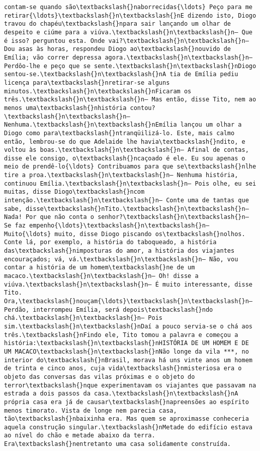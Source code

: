 \begin{Verbatim}[commandchars=\\\{\}]
contam-se quando são\textbackslash{}naborrecidas{\ldots} Peço para me retirar{\ldots}\textbackslash{}n\textbackslash{}nE dizendo isto, Diogo travou do chapéu\textbackslash{}npara sair lançando um olhar de despeito e ciúme para a viúva.\textbackslash{}n\textbackslash{}n— Que é isso? perguntou esta. Onde vai?\textbackslash{}n\textbackslash{}n— Dou asas às horas, respondeu Diogo ao\textbackslash{}nouvido de Emília; vão correr depressa agora.\textbackslash{}n\textbackslash{}n— Perdôo-lhe e peço que se sente.\textbackslash{}n\textbackslash{}nDiogo sentou-se.\textbackslash{}n\textbackslash{}nA tia de Emília pediu licença para\textbackslash{}nretirar-se alguns minutos.\textbackslash{}n\textbackslash{}nFicaram os três.\textbackslash{}n\textbackslash{}n— Mas então, disse Tito, nem ao menos uma\textbackslash{}nhistória contou?\textbackslash{}n\textbackslash{}n— Nenhuma.\textbackslash{}n\textbackslash{}nEmília lançou um olhar a Diogo como para\textbackslash{}ntranqüilizá-lo. Este, mais calmo então, lembrou-se do que Adelaide lhe havia\textbackslash{}ndito, e voltou às boas.\textbackslash{}n\textbackslash{}n— Afinal de contas, disse ele consigo, o\textbackslash{}ncaçoado é ele. Eu sou apenas o meio de prendê-lo{\ldots} Contribuamos para que se\textbackslash{}nlhe tire a proa.\textbackslash{}n\textbackslash{}n— Nenhuma história, continuou Emília.\textbackslash{}n\textbackslash{}n— Pois olhe, eu sei muitas, disse Diogo\textbackslash{}ncom intenção.\textbackslash{}n\textbackslash{}n— Conte uma de tantas que sabe, disse\textbackslash{}nTito.\textbackslash{}n\textbackslash{}n— Nada! Por que não conta o senhor?\textbackslash{}n\textbackslash{}n— Se faz empenho{\ldots}\textbackslash{}n\textbackslash{}n— Muito{\ldots} muito, disse Diogo piscando os\textbackslash{}nolhos. Conte lá, por exemplo, a história do taboqueado, a história das\textbackslash{}nimposturas do amor, a história dos viajantes encouraçados; vá, vá.\textbackslash{}n\textbackslash{}n— Não, vou contar a história de um homem\textbackslash{}ne de um macaco.\textbackslash{}n\textbackslash{}n— Oh! disse a viúva.\textbackslash{}n\textbackslash{}n— É muito interessante, disse Tito. Ora,\textbackslash{}nouçam{\ldots}\textbackslash{}n\textbackslash{}n— Perdão, interrompeu Emília, será depois\textbackslash{}ndo chá.\textbackslash{}n\textbackslash{}n— Pois sim.\textbackslash{}n\textbackslash{}nDaí a pouco servia-se o chá aos três.\textbackslash{}nFindo ele, Tito tomou a palavra e começou a história:\textbackslash{}n\textbackslash{}nHISTÓRIA DE UM HOMEM E DE UM MACACO\textbackslash{}n\textbackslash{}nNão longe da vila ***, no interior do\textbackslash{}nBrasil, morava há uns vinte anos um homem de trinta e cinco anos, cuja vida\textbackslash{}nmisteriosa era o objeto das conversas das vilas próximas e o objeto do terror\textbackslash{}nque experimentavam os viajantes que passavam na estrada a dois passos da casa.\textbackslash{}n\textbackslash{}nA própria casa era já de causar\textbackslash{}napreensões ao espírito menos timorato. Vista de longe nem parecia casa, tão\textbackslash{}nbaixinha era. Mas quem se aproximasse conheceria aquela construção singular.\textbackslash{}nMetade do edifício estava ao nível do chão e metade abaixo da terra. Era\textbackslash{}nentretanto uma casa solidamente construída. 
\end{Verbatim}
